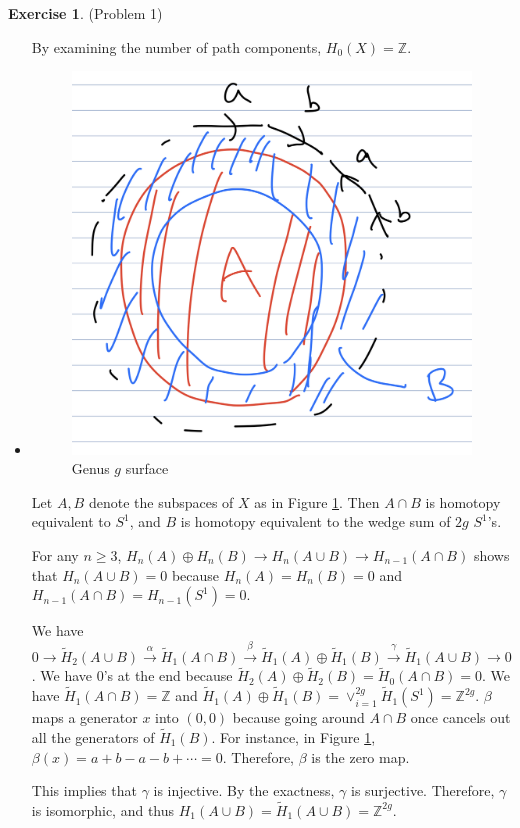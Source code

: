 \documentclass[psamsfonts]{amsart}
\theoremstyle{definition}
\newtheorem*{exer}{Exercise}
\theoremstyle{remark}
\numberwithin{equation}{section}
\begin{document}
\begin{exer}{(Problem 1)}
\begin{itemize}
       By examining the number of path components, $H_0(X) = \mathbb{Z}$.
     \item
       \begin{figure}
       \includegraphics[width=.5\linewidth]{gtorus.jpeg}
       \caption{Genus $g$ surface}
       \label{fig:gtorus}
       \end{figure}
       Let $A, B$ denote the subspaces of $X$ as in Figure \ref{fig:gtorus}.
       Then $A \cap B$ is homotopy equivalent to $S^1$, and $B$ is homotopy equivalent to the wedge sum of $2g$ $S^1$'s.

       For any $n \geq 3$, $H_n(A) \oplus H_n(B) \rightarrow H_n(A \cup B) \rightarrow H_{n - 1}(A \cap B)$ shows that $H_n(A \cup B) = 0$ because $H_n(A) = H_n(B) = 0$ and $H_{n - 1}(A \cap B) = H_{n - 1}(S^1) = 0$.

       We have $0 \rightarrow \tilde{H}_2(A \cup B) \xrightarrow{\alpha} \tilde{H}_1(A \cap B) \xrightarrow{\beta} \tilde{H}_1(A) \oplus \tilde{H}_1(B) \xrightarrow{\gamma} \tilde{H}_1(A \cup B) \rightarrow 0$.
       We have 0's at the end because $\tilde{H}_2(A) \oplus \tilde{H}_2(B) = \tilde{H}_0(A \cap B) = 0$.
       We have $\tilde{H}_1(A \cap B) = \mathbb{Z}$ and $\tilde{H}_1(A) \oplus \tilde{H}_1(B) = \vee_{i=1}^{2g}\tilde{H}_1(S^1) = \mathbb{Z}^{2g}$.
       $\beta$ maps a generator $x$ into $(0, 0)$ because going around $A \cap B$ once cancels out all the generators of $\tilde{H}_1(B)$.
       For instance, in Figure \ref{fig:gtorus}, $\beta(x) = a + b - a - b + \cdots = 0$.
       Therefore, $\beta$ is the zero map.

       This implies that $\gamma$ is injective.
       By the exactness, $\gamma$ is surjective.
       Therefore, $\gamma$ is isomorphic, and thus $H_1(A \cup B) = \tilde{H}_1(A \cup B) = \mathbb{Z}^{2g}$.


\end{itemize}
\end{exer}
\end{document}
